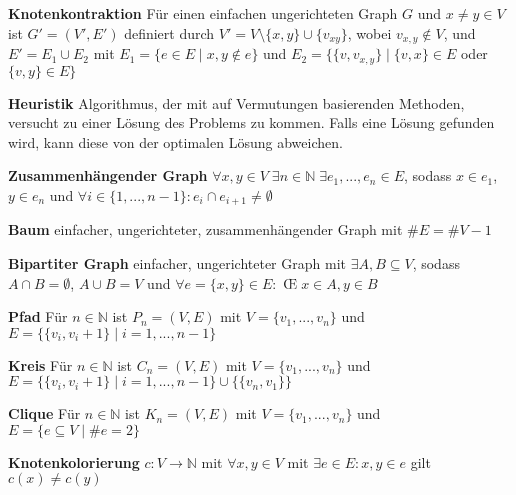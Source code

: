 \documentclass{article}
\begin{document}
	\hangindent=1.5cm 
	\textbf{Knotenkontraktion} \newline
	Für einen einfachen ungerichteten Graph $G$ und $x \neq y \in V$ ist $G'=(V',E')$ definiert durch $V' = V \setminus \{x,y\} \cup \{v_{xy}\}$, wobei $v_{x,y} \notin V$, und $E' = E_1 \cup E_2$ mit $E_1 = \{e \in E \mid x,y \notin e\}$ und $E_2 = \{\{v, v_{x,y}\} \mid \{v,x\} \in E $ oder $ \{v,y\} \in E\}$
	
	
	\hangindent=1.5cm 
	\textbf{Heuristik} \newline
	Algorithmus, der mit auf Vermutungen basierenden Methoden, versucht zu einer Lösung des Problems zu kommen. Falls eine Lösung gefunden wird, kann diese von der optimalen Lösung abweichen.
	
	\hangindent=1.5cm 
	\textbf{Zusammenhängender Graph} \newline
	$\forall x,y \in V \;\exists n \in \mathbb N \;\exists e_1, ..., e_n \in E$, sodass $x \in e_1$, $y \in e_n$ und $\forall i \in \{1, ..., n-1\}: e_i \cap e_{i+1} \neq \emptyset$
	
	\hangindent=1.5cm 
	\textbf{Baum} \newline
	einfacher, ungerichteter, zusammenhängender Graph mit $\# E = \#V-1$
	
	\hangindent=1.5cm 
	\textbf{Bipartiter Graph} \newline
	einfacher, ungerichteter Graph mit $\exists A,B \subseteq V$, sodass $A \cap B = \emptyset$, $A \cup B = V$ und $\forall e = \{x,y\} \in E:$ \OE $\; x \in A, y \in B$
	
	\hangindent=1.5cm 
	\textbf{Pfad} \newline
	Für $n \in \mathbb N$ ist $P_n = (V,E)$ mit $V = \{v_1, ..., v_n\}$ und $E = \{\{v_i, v_i+1\} \mid i = 1, ..., n-1\}$
	
	\hangindent=1.5cm 
	\textbf{Kreis} \newline
	Für $n \in \mathbb N$ ist $C_n = (V,E)$ mit $V = \{v_1, ..., v_n\}$ und $E = \{\{v_i, v_i+1\} \mid i = 1, ..., n-1\} \cup \{\{v_n, v_1\}\}$
	
	\hangindent=1.5cm 
	\textbf{Clique} \newline
	Für $n \in \mathbb N$ ist $K_n = (V,E)$ mit $V = \{v_1, ..., v_n\}$ und $E = \{e \subseteq V \mid \#e = 2\}$
	
	
	\hangindent=1.5cm 
	\textbf{Knotenkolorierung} \newline
	$c: V \to \mathbb N$ mit $\forall x,y \in V$ mit $\exists e \in E: x,y \in e$ gilt $c(x) \neq c(y)$
	
\end{document}
